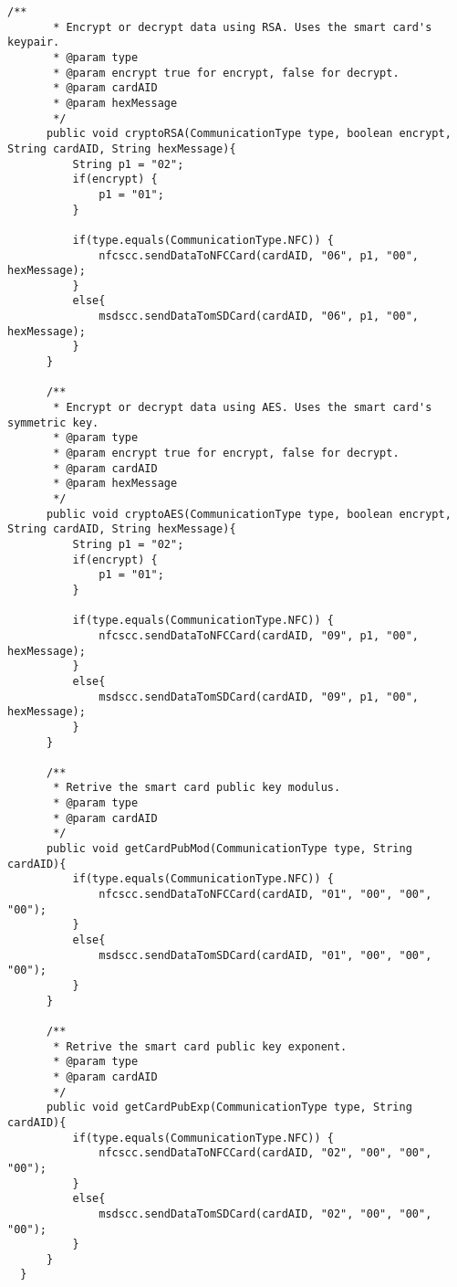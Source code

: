 \begin{lstlisting}[caption=CommunicationController.java.,breaklines=true,breakatwhitespace=false, label=lst:CommunicationController,escapechar=å]
      /**
       * Encrypt or decrypt data using RSA. Uses the smart card's keypair.
       * @param type
       * @param encrypt true for encrypt, false for decrypt.
       * @param cardAID
       * @param hexMessage
       */
      public void cryptoRSA(CommunicationType type, boolean encrypt, String cardAID, String hexMessage){
          String p1 = "02";
          if(encrypt) {
              p1 = "01";
          }

          if(type.equals(CommunicationType.NFC)) {
              nfcscc.sendDataToNFCCard(cardAID, "06", p1, "00", hexMessage);
          }
          else{
              msdscc.sendDataTomSDCard(cardAID, "06", p1, "00", hexMessage);
          }
      }

      /**
       * Encrypt or decrypt data using AES. Uses the smart card's symmetric key.
       * @param type
       * @param encrypt true for encrypt, false for decrypt.
       * @param cardAID
       * @param hexMessage
       */
      public void cryptoAES(CommunicationType type, boolean encrypt, String cardAID, String hexMessage){
          String p1 = "02";
          if(encrypt) {
              p1 = "01";
          }

          if(type.equals(CommunicationType.NFC)) {
              nfcscc.sendDataToNFCCard(cardAID, "09", p1, "00", hexMessage);
          }
          else{
              msdscc.sendDataTomSDCard(cardAID, "09", p1, "00", hexMessage);
          }
      }

      /**
       * Retrive the smart card public key modulus.
       * @param type
       * @param cardAID
       */
      public void getCardPubMod(CommunicationType type, String cardAID){
          if(type.equals(CommunicationType.NFC)) {
              nfcscc.sendDataToNFCCard(cardAID, "01", "00", "00", "00");
          }
          else{
              msdscc.sendDataTomSDCard(cardAID, "01", "00", "00", "00");
          }
      }

      /**
       * Retrive the smart card public key exponent.
       * @param type
       * @param cardAID
       */
      public void getCardPubExp(CommunicationType type, String cardAID){
          if(type.equals(CommunicationType.NFC)) {
              nfcscc.sendDataToNFCCard(cardAID, "02", "00", "00", "00");
          }
          else{
              msdscc.sendDataTomSDCard(cardAID, "02", "00", "00", "00");
          }
      }
  }

\end{lstlisting}
